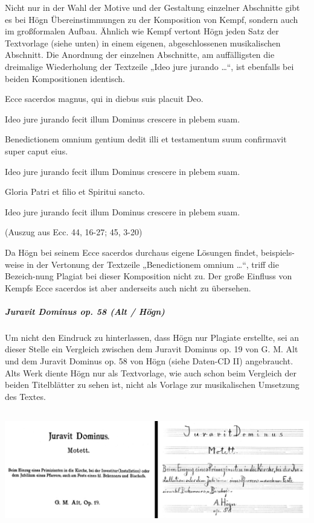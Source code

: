 Nicht nur in der Wahl der Motive und der Gestaltung einzelner Abschnitte
gibt es bei Högn Übereinstimmungen zu der Komposition von Kempf,
sondern auch im großformalen Aufbau. Ähnlich wie Kempf vertont Högn
jeden Satz der Textvorlage (siehe unten) in einem eigenen,
abgeschlossenen musikalischen Abschnitt. Die Anordnung der einzelnen
Abschnitte, am auffälligsten die dreimalige Wiederholung der Textzeile
„Ideo jure jurando …“, ist ebenfalls bei beiden Kompositionen
identisch.

Ecce sacerdos magnus, qui in diebus suis placuit Deo.

Ideo jure jurando fecit illum Dominus crescere in plebem suam.

Benedictionem omnium gentium dedit illi et testamentum suum confirmavit
super caput eius.

Ideo jure jurando fecit illum Dominus crescere in plebem suam.

Gloria Patri et filio et Spiritui sancto.

Ideo jure jurando fecit illum Dominus crescere in plebem suam.

(Auszug aus Ecc. 44, 16-27; 45, 3-20)

Da Högn bei seinem Ecce sacerdos durchaus eigene Lösungen findet,
beispiels-weise in der Vertonung der Textzeile „Benedictionem omnium
…“, triff die Bezeich-nung Plagiat bei dieser Komposition nicht zu. Der
große Einfluss von Kempfs Ecce sacerdos ist aber anderseits auch nicht
zu übersehen.

\clearpage\subparagraph{Juravit Dominus op. 58 (Alt / Högn)}
Um nicht den Eindruck zu hinterlassen, dass Högn nur Plagiate erstellte,
sei an dieser Stelle ein Vergleich zwischen dem Juravit Dominus op. 19
von G. M. Alt und dem Juravit Dominus op. 58 von Högn (siehe Daten-CD
II) angebraucht. Alts Werk diente Högn nur als Textvorlage, wie auch
schon beim Vergleich der beiden Titelblätter zu sehen ist, nicht als
Vorlage zur musikalischen Umsetzung des Textes.


\includegraphics[width=15.977cm,height=5.128cm]{pictures/zulassungsarbeit-img088.png}

